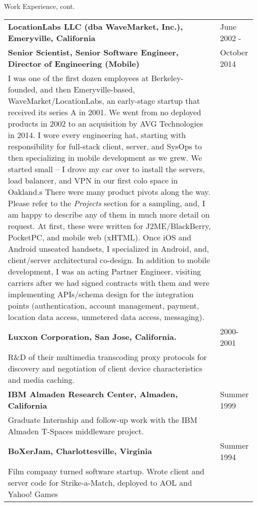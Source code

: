 \newpage
\begin{bf} \large
Work Experience, cont.
\end{bf}
\medskip

\begin{tabular}{p{5.2in}@{\hspace{1.5cm}}l}
	  
	\bf  LocationLabs LLC (dba WaveMarket, Inc.), Emeryville, California    & June 2002 -  \\
	\bf  Senior Scientist, Senior Software Engineer, Director of Engineering (Mobile) & October 2014 \\[4pt]
	
	   I was one of the first dozen employees at Berkeley-founded, and then Emeryville-based, 
	   WaveMarket/LocationLabs,
	   an early-stage startup that received its series A in 2001.
	   We went from no deployed products in 2002 to an
	   acquisition by AVG Technologies in 2014.  I wore every engineering hat, starting with responsibility
	   for full-stack client, server, and SysOps to
	   then specializing in mobile development as we grew.  
	   We started small -- 
	   I drove my car over to install the servers, load balancer, and VPN in our first colo space in Oakland.s
	   There were many product pivots along the way. Please refer to the {\it Projects} section for a sampling, 
	   and, I am happy to describe any of them in much more detail on request.
	   At first, these were written for J2ME/BlackBerry, PocketPC, and mobile web (xHTML).
	   Once iOS and Android unseated handsets, 
	   I specialized in Android, and, client/server architectural co-design.  In addition to mobile development, I was an acting
	   Partner Engineer, visiting carriers after we had signed contracts
	   with them and were implementing APIs/schema design for the integration points
	    (authentication, account management, payment, location data access, unmetered data access, messaging). \\[9pt]
       	  
    \bf Luxxon Corporation, San Jose, California. & 2000-2001 \\[3pt]
       R\&D of their multimedia transcoding proxy
       protocols for discovery and negotiation of client
       device characteristics and media caching. \\[9pt]

    \bf IBM Almaden Research Center, 
          Almaden, California                         & Summer 1999 \\[3pt]
       Graduate Internship and follow-up work with
       the IBM Almaden T-Spaces middleware project. \\[9pt]

    \bf BoXerJam, 
         Charlottesville, Virginia                        & Summer 1994 \\[3pt]
       Film company turned software startup. 
       Wrote client and server code for Strike-a-Match, deployed to AOL and Yahoo! Games \\[9pt]

\end{tabular}


